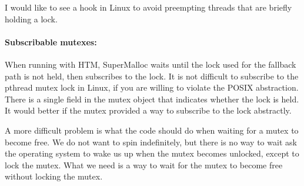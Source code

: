 \documentclass[natbib,sort&compress,10pt]{sigplanconf}
\begin{document}
I would like to see a hook in Linux to avoid preempting threads that
are briefly holding a lock.

{\paragraph{Subscribable mutexes:}} When running with HTM, SuperMalloc waits
until the lock used for the fallback path is not held, then 
subscribes to the lock.  It is not difficult to subscribe to the
pthread mutex lock in Linux, if you are willing to violate the POSIX
abstraction.  There is a single field in the mutex object that
indicates whether the lock is held.  It would better if the mutex
provided a way to subscribe to the lock abstractly.

A more difficult problem is what the code should do when waiting for
a mutex to become free.  We do not want to spin indefinitely, but
there is no way to wait ask the operating system to wake us up when
the mutex becomes unlocked, except to lock the mutex.  What we need is
a way to wait for the mutex to become free without locking the mutex. 

\end{document}
